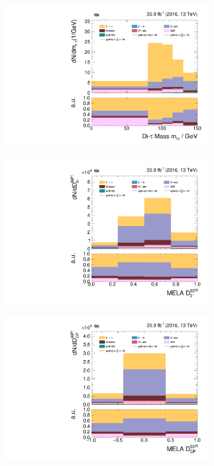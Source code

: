\begin{figure}[h!]
\begin{subfigure}{.3\textwidth}
        \includegraphics[width=\textwidth]{Figures/eventselection/em/dijet2D_lowboost/m_sv.pdf}
    \end{subfigure}%
    \begin{subfigure}{.3\textwidth}
        \centering
        \includegraphics[width=\textwidth]{Figures/eventselection/em/dijet2D_lowboost/melaDiscriminatorD0MinusGGH.pdf}
    \end{subfigure}%
    \begin{subfigure}{.3\textwidth}
        \centering
        \includegraphics[width=\textwidth]{Figures/eventselection/em/dijet2D_lowboost/melaDiscriminatorDCPGGH.pdf}

\end{subfigure}
\end{figure}
